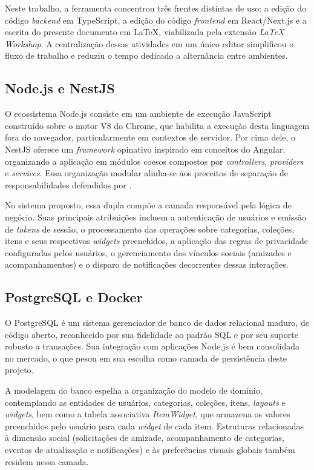 Neste trabalho, a ferramenta concentrou três frentes distintas de uso: a edição do código \textit{backend} em TypeScript, a edição do código \textit{frontend} em React/Next.js e a escrita do presente documento em LaTeX, viabilizada pela extensão \textit{LaTeX Workshop}. A centralização dessas atividades em um único editor simplificou o fluxo de trabalho e reduziu o tempo dedicado a alternância entre ambientes.

\subsection{Node.js e NestJS}

O ecossistema Node.js consiste em um ambiente de execução JavaScript construído sobre o motor V8 do Chrome, que habilita a execução desta linguagem fora do navegador, particularmente em contextos de servidor. Por cima dele, o NestJS oferece um \textit{framework} opinativo inspirado em conceitos do Angular, organizando a aplicação em módulos coesos compostos por \textit{controllers}, \textit{providers} e \textit{services}. Essa organização modular alinha-se aos preceitos de separação de responsabilidades defendidos por \cite{Fowler2002}.

No sistema proposto, essa dupla compõe a camada responsável pela lógica de negócio. Suas principais atribuições incluem a autenticação de usuários e emissão de \textit{tokens} de sessão, o processamento das operações sobre categorias, coleções, itens e seus respectivos \textit{widgets} preenchidos, a aplicação das regras de privacidade configuradas pelos usuários, o gerenciamento dos vínculos sociais (amizades e acompanhamentos) e o disparo de notificações decorrentes dessas interações.

\subsection{PostgreSQL e Docker}

O PostgreSQL é um sistema gerenciador de banco de dados relacional maduro, de código aberto, reconhecido por sua fidelidade ao padrão SQL e por seu suporte robusto a transações. Sua integração com aplicações Node.js é bem consolidada no mercado, o que pesou em sua escolha como camada de persistência deste projeto.

A modelagem do banco espelha a organização do modelo de domínio, contemplando as entidades de usuários, categorias, coleções, itens, \textit{layouts} e \textit{widgets}, bem como a tabela associativa \textit{ItemWidget}, que armazena os valores preenchidos pelo usuário para cada \textit{widget} de cada item. Estruturas relacionadas à dimensão social (solicitações de amizade, acompanhamento de categorias, eventos de atualização e notificações) e às preferências visuais globais também residem nessa camada.

